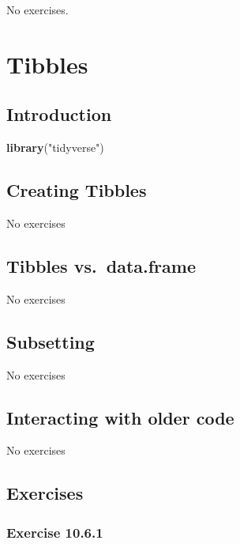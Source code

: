\documentclass[]{book}
\newenvironment{Shaded}{\begin{snugshade}}{\end{snugshade}}
\newcommand{\KeywordTok}[1]{\textcolor[rgb]{0.13,0.29,0.53}{\textbf{#1}}}
\newcommand{\NormalTok}[1]{#1}
\newcommand{\StringTok}[1]{\textcolor[rgb]{0.31,0.60,0.02}{#1}}
\theoremstyle{plain}
\theoremstyle{remark}
\begin{document}
No exercises.

\hypertarget{tibbles}{%
\chapter{Tibbles}\label{tibbles}}

\hypertarget{introduction-5}{%
\section{Introduction}\label{introduction-5}}

\begin{Shaded}
\begin{Highlighting}[]
\KeywordTok{library}\NormalTok{(}\StringTok{"tidyverse"}\NormalTok{)}
\end{Highlighting}
\end{Shaded}

\hypertarget{creating-tibbles}{%
\section{Creating Tibbles}\label{creating-tibbles}}

No exercises

\hypertarget{tibbles-vs.data.frame}{%
\section{Tibbles vs.~data.frame}\label{tibbles-vs.data.frame}}

No exercises

\hypertarget{subsetting}{%
\section{Subsetting}\label{subsetting}}

No exercises

\hypertarget{interacting-with-older-code}{%
\section{Interacting with older code}\label{interacting-with-older-code}}

No exercises

\hypertarget{exercises}{%
\section{Exercises}\label{exercises}}

\hypertarget{exercise-10.6.1}{%
\subsection*{\texorpdfstring{Exercise {10.6.1}}{Exercise 10.6.1}}\label{exercise-10.6.1}}
\end{document}
